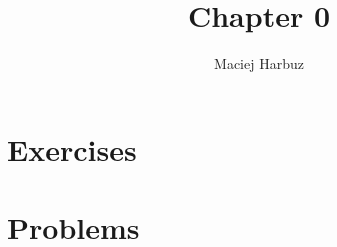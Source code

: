 \documentclass[12pt, a4paper]{article}
\title{Chapter 0}
\author{Maciej Harbuz}
\begin{document}
\maketitle

\section{Exercises}


\section{Problems}

\end{document}

